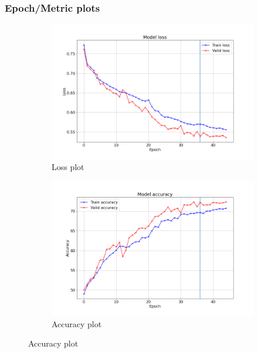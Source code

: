 \documentclass{beamer}
\begin{document}
\begin{frame}
\frametitle{Epoch/Metric plots}

\begin{figure}
    \centering
    \begin{subfigure}[b]{0.49\textwidth}
        \includegraphics[width=\textwidth]{images/loss_avxline.png}
        \caption*{Loss plot}
    \end{subfigure}
    \begin{subfigure}[b]{0.49\textwidth}
        \includegraphics[width=\textwidth]{images/accuracy_avxline.png}
        \caption*{Accuracy plot}
    \end{subfigure}
\end{figure}
	
\end{frame}

\end{document}
